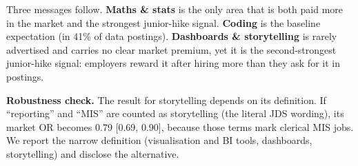 
Three messages follow. \textbf{Maths \& stats} is the only area that is both paid more in the market
and the strongest junior-hike signal. \textbf{Coding} is the baseline expectation (in 41\% of
data postings). \textbf{Dashboards \& storytelling} is rarely advertised and carries no clear market
premium, yet it is the second-strongest junior-hike signal: employers reward it after hiring more
than they ask for it in postings.

\textbf{Robustness check.} The result for storytelling depends on its definition. If ``reporting''
and ``MIS'' are counted as storytelling (the literal JDS wording), its market OR becomes 0.79
[0.69, 0.90], because those terms mark clerical MIS jobs. We report the narrow definition
(visualisation and BI tools, dashboards, storytelling) and disclose the alternative.
